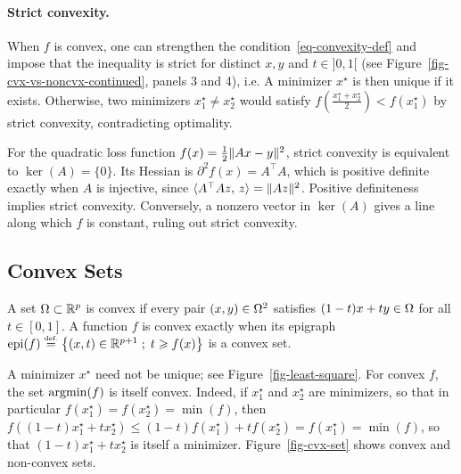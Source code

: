 \paragraph{Strict convexity.}

When $f$ is convex, one can strengthen the condition~\eqref{eq-convexity-def} and impose that the inequality is strict for distinct $x,y$ and $t\in]0,1[$ (see Figure~\ref{fig-cvx-vs-noncvx-continued}, panels 3 and 4), i.e.
\eql{\label{eq-strict-convexity-def}
	\foralls t \in ]0,1[, \quad
		f((1-t)x + t y) < (1-t)f(x) + t f(y).
}
A minimizer $x^\star$ is then unique if it exists. Otherwise, two minimizers $x_1^\star \neq x_2^\star$ would satisfy $f(\frac{x_1^\star+x_2^\star}{2}) < f(x_1^\star)$ by strict convexity, contradicting optimality.

\begin{exmp}
	For the quadratic loss function $f(x)=\frac{1}{2}\lVert Ax-y\rVert^2$, strict convexity is equivalent to $\ker(A)=\{0\}$.
	Its Hessian is $\partial^2 f(x)=A^\top A$, which is positive definite exactly when $A$ is injective, since $\langle A^\top A z,\,z\rangle=\lVert Az\rVert^2$. Positive definiteness implies strict convexity. Conversely, a nonzero vector in $\ker(A)$ gives a line along which $f$ is constant, ruling out strict convexity.
\end{exmp}

\subsection{Convex Sets}

A set $\Omega \subset \mathbb{R}^p$ is convex if every pair $(x,y) \in \Omega^2$ satisfies $(1-t)x + t y \in \Omega$ for all $t \in [0,1]$.
%
A function $f$ is convex exactly when its epigraph $\text{epi}(f) \stackrel{\mbox{\upshape\tiny def.}}{=} \left\{ (x,t) \in \mathbb{R}^{p+1} \;;\; t \geqslant f(x) \right\}$ is a convex set.

\begin{rem}
A minimizer $x^\star$ need not be unique; see Figure~\ref{fig-least-square}.
%
For convex $f$, the set $\operatorname{argmin}(f)$ is itself convex.
%
Indeed, if $x_1^\star$ and $x_2^\star$ are minimizers, so that in particular $f(x_1^\star)=f(x_2^\star)=\min(f)$, then $f( (1-t)x_1^\star + t x_2^\star ) \leq (1-t) f(x_1^\star) + t f(x_2^\star) = f(x_1^\star) = \min(f)$, so that $(1-t)x_1^\star + t x_2^\star$ is itself a minimizer. Figure~\ref{fig-cvx-set} shows convex and non-convex sets. 
\end{rem}



